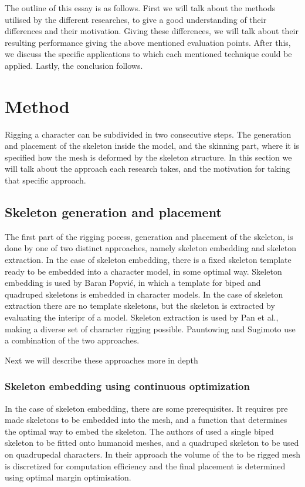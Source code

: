 \documentclass{article}
\begin{document}
The outline of this essay is as follows. First we will talk about the methods
utilised by the different researches, to give a good understanding of their
differences and their motivation. Giving these differences, we will talk about
their resulting performance giving the above
mentioned evaluation points. After this, we discuss the specific applications to
which each mentioned technique could be applied. Lastly, the conclusion follows.

\section{Method}
Rigging a character can be subdivided in two consecutive steps. The generation
and placement of the skeleton inside the model, and the skinning part, where it
is specified how the mesh is deformed by the skeleton structure. In this section we will talk
about the approach each research takes, and the motivation for
taking that specific approach.

\subsection{Skeleton generation and placement}
The first part of the rigging pocess, generation and placement of the skeleton, 
is done by one of two distinct approaches, namely skeleton
embedding and skeleton extraction. In the case of skeleton embedding, there
is a fixed skeleton template ready to be embedded into a character model,
in some optimal way. Skeleton embedding is used by
Baran Popvi\'{c}\citep{paper1}, in which a template for biped and quadruped skeletons is
embedded in character models. In the case of skeleton extraction there
are no template skeletons, but the skeleton is extracted by evaluating the
interipr of a model. Skeleton extraction is used by Pan et al.\citep{paper2},
making a diverse set of character rigging possible.
Pauntowing and Sugimoto \citep{paper3} use a combination of the two approaches.

Next we will describe these approaches more in depth

\subsubsection{Skeleton embedding using continuous optimization}
In the case of skeleton embedding, there are some prerequisites. It requires pre
made skeletons to be embedded into the mesh, and a function that determines the
optimal way to embed the skeleton. 
The authors of \citep{paper1} used a single biped skeleton to be fitted onto
humanoid meshes, and a quadruped skeleton to be used on quadrupedal characters.
In their approach the volume of the to be rigged mesh is discretized for
computation efficiency and the final placement is determined using optimal
margin optimisation.
\end{document}

